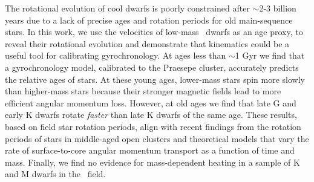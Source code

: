 
The rotational evolution of cool dwarfs is poorly constrained after $\sim$2-3
billion years due to a lack of precise ages and rotation periods for old
main-sequence stars.
In this work, we use the velocities of low-mass \kepler\ dwarfs as an age
proxy, to reveal their rotational evolution and demonstrate that kinematics
could be a useful tool for calibrating gyrochronology.
At ages less than $\sim$1 Gyr we find that a gyrochronology model, calibrated
to the Praesepe cluster, accurately predicts the relative ages of stars.
At these young ages, lower-mass stars spin more slowly than higher-mass stars
because their stronger magnetic fields lead to more efficient angular momentum
loss.
However, at old ages we find that late G and early K dwarfs rotate {\it
faster} than late K dwarfs of the same age.
These results, based on field star rotation periods, align with recent
findings from the rotation periods of stars in middle-aged open clusters and
theoretical models that vary the rate of surface-to-core angular momentum
transport as a function of time and mass.
Finally, we find no evidence for mass-dependent heating in a sample of K and M
dwarfs in the \kepler\ field.

